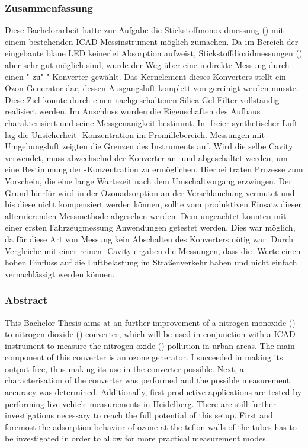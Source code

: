 
\subsubsection*{Zusammenfassung}
\label{sec:Zusammenfassung}

Diese Bachelorarbeit hatte zur Aufgabe die Stickstoffmonoxidmessung
() mit einem bestehenden ICAD Messinstrument möglich
zumachen. Da  im Bereich der eingebaute blaue LED keinerlei
Absorption aufweist, Stickstoffdioxidmessungen () aber sehr
gut möglich sind, wurde der Weg über eine indirekte Messung durch
einen "-zu"-"-Konverter gewählt. Das Kernelement dieses
Konverters stellt ein Ozon-Generator dar, dessen Ausgangsluft komplett
von  gereinigt werden musste. Diese Ziel konnte durch einen
nachgeschaltenen Silica Gel Filter vollständig realisiert werden. Im
Anschluss wurden die Eigenschaften des Aufbaus charakterisiert und
seine Messgenauigkeit bestimmt. In -freier synthetischer Luft
lag die Unsicherheit -Konzentration im
Promillebereich. Messungen mit Umgebungsluft zeigten die Grenzen des
Instruments auf. Wird die selbe Cavity verwendet, muss abwechselnd der
Konverter an- und abgeschaltet werden, um eine Bestimmung der
-Konzentration zu ermöglichen. Hierbei traten Prozesse zum
Vorschein, die eine lange Wartezeit nach dem Umschaltvorgang
erzwingen. Der Grund hierfür wird in der Ozonadsorption an der
Verschlauchung vermutet und bis diese nicht kompensiert werden können,
sollte vom produktiven Einsatz dieser alternierenden Messmethode
abgesehen werden. Dem ungeachtet konnten mit einer ersten
Fahrzeugmessung Anwendungen getestet werden. Dies war möglich, da für
diese Art von Messung kein Abschalten des Konverters nötig war. Durch
Vergleiche mit einer reinen -Cavity ergaben die Messungen,
dass die -Werte einen hohen Einfluss auf die Luftbelastung im
Straßenverkehr haben und nicht einfach vernachlässigt werden können. 


\subsubsection*{Abstract}
\label{sec:abstract}

This Bachelor Thesis aims at an further improvement of a nitrogen
monoxide () to nitrogen dioxide () converter, which
will be used in conjunction with a ICAD instrument to measure the
nitrogen oxide () pollution in urban areas. The main
component of this converter is an ozone generator. I succeeded in
making its output  free, thus making its use in the converter
possible. Next, a characterisation of the converter was performed and
the possible  measurement accuracy was
determined. Additionally, first productive applications are tested by 
performing live vehicle measurements in Heidelberg. There are still
further investigations necessary to reach the full potential of this
setup. First and foremost the adsorption behavior of ozone at the
teflon walls of the tubes has to be investigated in order to allow for
more practical measurement modes.


